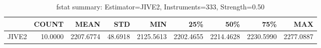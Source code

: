 \begin{table}[ht]
\centering
\caption{fstat summary: Estimator=JIVE2, Instruments=333, Strength=0.50}
\begin{tabular}{lrrrrrrrr}
\toprule
 & COUNT & MEAN & STD & MIN & 25\% & 50\% & 75\% & MAX \\
\midrule
JIVE2 & 10.0000 & 2207.6774 & 48.6918 & 2125.5613 & 2202.4655 & 2214.4628 & 2230.5990 & 2277.0887 \\
\bottomrule
\end{tabular}
\end{table}
